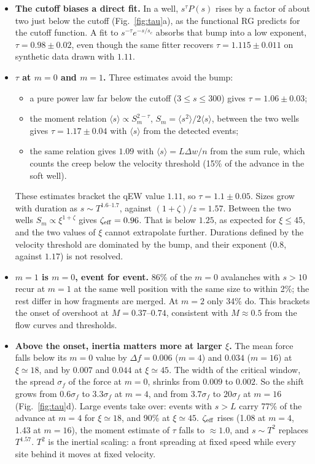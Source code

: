 \documentclass[10pt,a4paper]{article}
\begin{document}
\begin{itemize}
\item \textbf{The cutoff biases a direct fit.} In a well, $s^{\tau}P(s)$ rises by a factor of about two just below the cutoff (Fig.~\ref{fig:tau}a), as the functional RG predicts for the cutoff function. A fit to $s^{-\tau}e^{-s/s_c}$ absorbs that bump into a low exponent, $\tau=0.98\pm0.02$, even though the same fitter recovers $\tau=1.115\pm0.011$ on synthetic data drawn with $1.11$.
\item \textbf{$\tau$ at $m=0$ and $m=1$.} Three estimates avoid the bump:
\begin{itemize}
\item a pure power law far below the cutoff ($3\le s\le300$) gives $\tau=1.06\pm0.03$;
\item the moment relation $\langle s\rangle\propto S_m^{2-\tau}$, $S_m=\langle s^2\rangle/2\langle s\rangle$, between the two wells gives $\tau=1.17\pm0.04$ with $\langle s\rangle$ from the detected events;
\item the same relation gives $1.09$ with $\langle s\rangle=L\Delta w/n$ from the sum rule, which counts the creep below the velocity threshold (15\% of the advance in the soft well).
\end{itemize}
These estimates bracket the qEW value $1.11$, so $\tau=1.1\pm0.05$. Sizes grow with duration as $s\sim T^{1.6\text{--}1.7}$, against $(1+\zeta)/z=1.57$. Between the two wells $S_m\propto\xi^{1+\zeta}$ gives $\zeta_{\rm eff}=0.96$. That is below $1.25$, as expected for $\xi\le45$, and the two values of $\xi$ cannot extrapolate further. Durations defined by the velocity threshold are dominated by the bump, and their exponent ($0.8$, against $1.17$) is not resolved.
\item \textbf{$m=1$ is $m=0$, event for event.} 86\% of the $m=0$ avalanches with $s>10$ recur at $m=1$ at the same well position with the same size to within 2\%; the rest differ in how fragments are merged. At $m=2$ only 34\% do. This brackets the onset of overshoot at $M=0.37$--$0.74$, consistent with $M\approx0.5$ from the flow curves and thresholds.
\item \textbf{Above the onset, inertia matters more at larger $\xi$.} The mean force falls below its $m=0$ value by $\Delta f=0.006$ ($m=4$) and $0.034$ ($m=16$) at $\xi\simeq18$, and by $0.007$ and $0.044$ at $\xi\simeq45$. The width of the critical window, the spread $\sigma_f$ of the force at $m=0$, shrinks from $0.009$ to $0.002$. So the shift grows from $0.6\sigma_f$ to $3.3\sigma_f$ at $m=4$, and from $3.7\sigma_f$ to $20\sigma_f$ at $m=16$ (Fig.~\ref{fig:tau}d). Large events take over: events with $s>L$ carry 77\% of the advance at $m=4$ for $\xi\simeq18$, and 90\% at $\xi\simeq45$. $\zeta_{\rm eff}$ rises (1.08 at $m=4$, 1.43 at $m=16$), the moment estimate of $\tau$ falls to $\approx1.0$, and $s\sim T^2$ replaces $T^{1.57}$. $T^2$ is the inertial scaling: a front spreading at fixed speed while every site behind it moves at fixed velocity.
\end{itemize}
\end{document}
